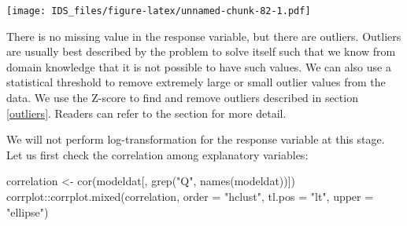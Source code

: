 \documentclass[
  12pt,
]{krantz}
\makeatletter
\newenvironment{Shaded}{\begin{snugshade}}{\end{snugshade}}
\newcommand{\AttributeTok}[1]{\textcolor[rgb]{0.61,0.61,0.61}{#1}}
\newcommand{\CommentTok}[1]{\textcolor[rgb]{0.37,0.37,0.37}{\textit{#1}}}
\newcommand{\DecValTok}[1]{\textcolor[rgb]{0.06,0.06,0.06}{#1}}
\newcommand{\FloatTok}[1]{\textcolor[rgb]{0.06,0.06,0.06}{#1}}
\newcommand{\FunctionTok}[1]{\textcolor[rgb]{0,0,0}{#1}}
\newcommand{\NormalTok}[1]{#1}
\newcommand{\OtherTok}[1]{\textcolor[rgb]{0.37,0.37,0.37}{#1}}
\newcommand{\SpecialCharTok}[1]{\textcolor[rgb]{0,0,0}{#1}}
\newcommand{\StringTok}[1]{\textcolor[rgb]{0.5,0.5,0.5}{#1}}
\newenvironment{kframe}{%
\medskip{}
\setlength{\fboxsep}{.8em}
 \def\at@end@of@kframe{}%
 \ifinner\ifhmode%
  \def\at@end@of@kframe{\end{minipage}}%
  \begin{minipage}{\columnwidth}%
 \fi\fi%
 \def\FrameCommand##1{\hskip\@totalleftmargin \hskip-\fboxsep
 \colorbox{shadecolor}{##1}\hskip-\fboxsep
     \hskip-\linewidth \hskip-\@totalleftmargin \hskip\columnwidth}%
 \MakeFramed {\advance\hsize-\width
   \@totalleftmargin\z@ \linewidth\hsize
   \@setminipage}}%
 {\par\unskip\endMakeFramed%
 \at@end@of@kframe}
\renewenvironment{Shaded}{\begin{kframe}}{\end{kframe}}
\makeatother
\begin{document}
\begin{Shaded}
\end{Shaded}

\texttt{[image: IDS\_files/figure-latex/unnamed-chunk-82-1.pdf]}

There is no missing value in the response variable, but there are outliers. Outliers are usually best described by the problem to solve itself such that we know from domain knowledge that it is not possible to have such values. We can also use a statistical threshold to remove extremely large or small outlier values from the data. We use the Z-score to find and remove outliers described in section \ref{outliers}. Readers can refer to the section for more detail.

\begin{Shaded}
\end{Shaded}

We will not perform log-transformation for the response variable at this stage. Let us first check the correlation among explanatory variables:

\begin{Shaded}
\begin{Highlighting}[]
\NormalTok{correlation }\OtherTok{\textless{}{-}} \FunctionTok{cor}\NormalTok{(modeldat[, }\FunctionTok{grep}\NormalTok{(}\StringTok{"Q"}\NormalTok{, }\FunctionTok{names}\NormalTok{(modeldat))])}
\NormalTok{corrplot}\SpecialCharTok{::}\FunctionTok{corrplot.mixed}\NormalTok{(correlation, }\AttributeTok{order =} \StringTok{"hclust"}\NormalTok{, }\AttributeTok{tl.pos =} \StringTok{"lt"}\NormalTok{, }
    \AttributeTok{upper =} \StringTok{"ellipse"}\NormalTok{)}
\end{Highlighting}
\end{Shaded}
\end{document}
